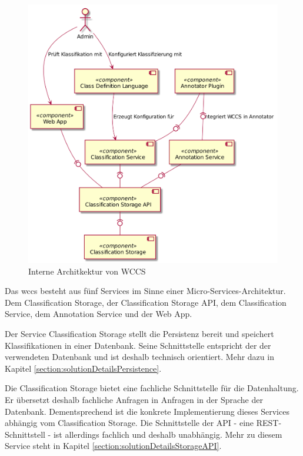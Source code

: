         \begin{figure}
            \centering
            \includegraphics[scale=\imageScalingFactor]{../resources/architecture/wccs_internal_architecture.png}
            \caption{Interne Architkektur von WCCS}
            \label{image:wccsInternalArchitecture}
        \end{figure}

        Das \gls{wccs} besteht aus fünf Services im Sinne einer Micro-Services-Architektur.
        Dem Classification Storage, der Classification Storage API, dem Classification Service, dem
        Annotation Service und der Web App.

        Der Service Classification Storage stellt die Persistenz bereit und speichert
        Klassifikationen in einer Datenbank.
        Seine Schnittstelle entspricht der der verwendeten Datenbank und ist deshalb
        technisch orientiert.
        Mehr dazu in Kapitel \ref{section:solutionDetailsPersistence}.

        Die Classification Storage bietet eine fachliche Schnittstelle für die Datenhaltung.
        Er übersetzt deshalb fachliche Anfragen in Anfragen in der Sprache der Datenbank.
        Dementsprechend ist die konkrete Implementierung dieses Services abhängig vom Classification Storage.
        Die Schnittstelle der API - eine REST-Schnittstell - ist allerdings fachlich und deshalb
        unabhängig. Mehr zu diesem Service steht in  Kapitel \ref{section:solutionDetailsStorageAPI}.

